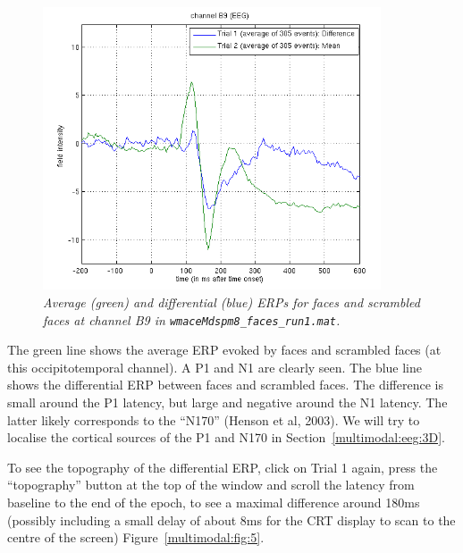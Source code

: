 \begin{figure}
\begin{center}
\includegraphics[width=100mm]{multimodal/figures/eeg_erp}
\caption{\em  Average (green) and differential (blue) ERPs for faces and scrambled faces at channel B9 in \texttt{wmaceMdspm8\_faces\_run1.mat}. \label{multimodal:fig:4}}
\end{center}
\end{figure}

The green line shows the average ERP evoked by faces and scrambled faces (at this occipitotemporal channel). A P1 and N1 are clearly seen. The blue line shows the differential ERP between faces and scrambled faces. The difference is small around the P1 latency, but large and negative around the N1 latency. The latter likely corresponds to the ``N170'' (Henson et al, 2003). We will try to localise the cortical sources of the P1 and N170 in Section~\ref{multimodal:eeg:3D}.

To see the topography of the differential ERP, click on Trial 1 again, press the ``topography'' button at the top of the window and scroll the latency from baseline to the end of the epoch, to see a maximal difference around 180ms (possibly including a small delay of about 8ms for the CRT display to scan to the centre of the screen) Figure~\ref{multimodal:fig:5}.

